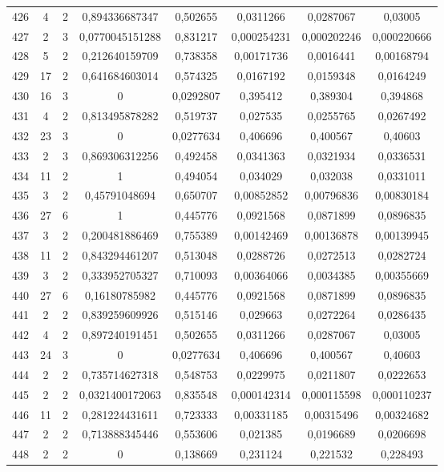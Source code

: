 \begin{longtable}{|c|c|c|c|c|c|c|c|}
426 & 4 & 2 & 0,894336687347 & 0,502655 & 0,0311266 & 0,0287067 & 0,03005  \\
427 & 2 & 3 & 0,0770045151288 & 0,831217 & 0,000254231 & 0,000202246 & 0,000220666  \\
428 & 5 & 2 & 0,212640159709 & 0,738358 & 0,00171736 & 0,0016441 & 0,00168794  \\
429 & 17 & 2 & 0,641684603014 & 0,574325 & 0,0167192 & 0,0159348 & 0,0164249  \\
430 & 16 & 3 & 0 & 0,0292807 & 0,395412 & 0,389304 & 0,394868  \\
431 & 4 & 2 & 0,813495878282 & 0,519737 & 0,027535 & 0,0255765 & 0,0267492  \\
432 & 23 & 3 & 0 & 0,0277634 & 0,406696 & 0,400567 & 0,40603  \\
433 & 2 & 3 & 0,869306312256 & 0,492458 & 0,0341363 & 0,0321934 & 0,0336531  \\
434 & 11 & 2 & 1 & 0,494054 & 0,034029 & 0,032038 & 0,0331011  \\
435 & 3 & 2 & 0,45791048694 & 0,650707 & 0,00852852 & 0,00796836 & 0,00830184  \\
436 & 27 & 6 & 1 & 0,445776 & 0,0921568 & 0,0871899 & 0,0896835  \\
437 & 3 & 2 & 0,200481886469 & 0,755389 & 0,00142469 & 0,00136878 & 0,00139945  \\
438 & 11 & 2 & 0,843294461207 & 0,513048 & 0,0288726 & 0,0272513 & 0,0282724  \\
439 & 3 & 2 & 0,333952705327 & 0,710093 & 0,00364066 & 0,0034385 & 0,00355669  \\
440 & 27 & 6 & 0,16180785982 & 0,445776 & 0,0921568 & 0,0871899 & 0,0896835  \\
441 & 2 & 2 & 0,839259609926 & 0,515146 & 0,029663 & 0,0272264 & 0,0286435  \\
442 & 4 & 2 & 0,897240191451 & 0,502655 & 0,0311266 & 0,0287067 & 0,03005  \\
443 & 24 & 3 & 0 & 0,0277634 & 0,406696 & 0,400567 & 0,40603  \\
444 & 2 & 2 & 0,735714627318 & 0,548753 & 0,0229975 & 0,0211807 & 0,0222653  \\
445 & 2 & 2 & 0,0321400172063 & 0,835548 & 0,000142314 & 0,000115598 & 0,000110237  \\
446 & 11 & 2 & 0,281224431611 & 0,723333 & 0,00331185 & 0,00315496 & 0,00324682  \\
447 & 2 & 2 & 0,713888345446 & 0,553606 & 0,021385 & 0,0196689 & 0,0206698  \\
448 & 2 & 2 & 0 & 0,138669 & 0,231124 & 0,221532 & 0,228493  \\

\end{longtable}
